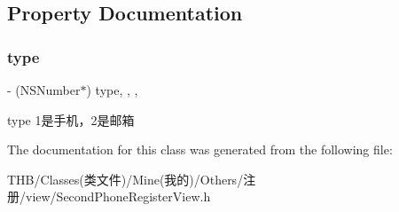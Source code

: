 \subsection{Property Documentation}
\mbox{\label{interface_second_phone_register_view_a8b0f97a4c3c68e9727401bf001fac182}} 
\subsubsection{\texorpdfstring{type}{type}}
{\footnotesize\ttfamily -\/ (N\+S\+Number$\ast$) type\hspace{0.3cm}{\ttfamily [read]}, {\ttfamily [write]}, {\ttfamily [nonatomic]}, {\ttfamily [assign]}}

type 1是手机，2是邮箱 

The documentation for this class was generated from the following file\+:\begin{DoxyCompactItemize}
\item 
T\+H\+B/\+Classes(类文件)/\+Mine(我的)/\+Others/注册/view/Second\+Phone\+Register\+View.\+h\end{DoxyCompactItemize}
